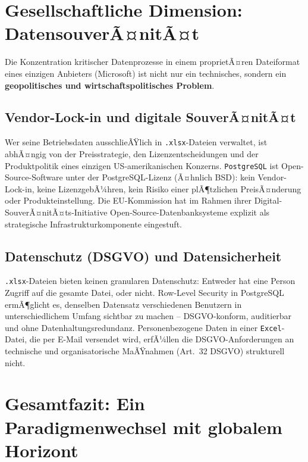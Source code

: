﻿\documentclass[12pt,a4paper]{report}
\theoremstyle{definition}
\theoremstyle{remark}
\newcommand{\excel}{\texttt{Excel}}
\newcommand{\pg}{\texttt{PostgreSQL}}
\newcommand{\code}[1]{\texttt{#1}}
\begin{document}
\section{Gesellschaftliche Dimension: DatensouverÃ¤nitÃ¤t}

Die Konzentration kritischer Datenprozesse in einem proprietÃ¤ren
Dateiformat eines einzigen Anbieters (Microsoft) ist nicht nur ein
technisches, sondern ein \textbf{geopolitisches und
wirtschaftspolitisches Problem}.

\subsection{Vendor-Lock-in und digitale SouverÃ¤nitÃ¤t}

Wer seine Betriebsdaten ausschlieÃŸlich in \code{.xlsx}-Dateien
verwaltet, ist abhÃ¤ngig von der Preisstrategie, den
Lizenzentscheidungen und der Produktpolitik eines einzigen
US-amerikanischen Konzerns.
\pg{} ist Open-Source-Software unter der PostgreSQL-Lizenz
(Ã¤hnlich BSD): kein Vendor-Lock-in, keine LizenzgebÃ¼hren,
kein Risiko einer plÃ¶tzlichen PreisÃ¤nderung oder Produkteinstellung.
Die EU-Kommission hat im Rahmen ihrer Digital-SouverÃ¤nitÃ¤ts-Initiative
Open-Source-Datenbanksysteme explizit als strategische
Infrastrukturkomponente eingestuft.

\subsection{Datenschutz (DSGVO) und Datensicherheit}

\code{.xlsx}-Dateien bieten keinen granularen Datenschutz:
Entweder hat eine Person Zugriff auf die gesamte Datei, oder nicht.
Row-Level Security in PostgreSQL ermÃ¶glicht es, denselben Datensatz
verschiedenen Benutzern in unterschiedlichem Umfang sichtbar zu machen
-- DSGVO-konform, auditierbar und ohne Datenhaltungsredundanz.
Personenbezogene Daten in einer \excel-Datei, die per E-Mail versendet
wird, erfÃ¼llen die DSGVO-Anforderungen an technische und
organisatorische MaÃŸnahmen (Art.~32 DSGVO) strukturell nicht.

\section{Gesamtfazit: Ein Paradigmenwechsel mit globalem Horizont}
\end{document}
